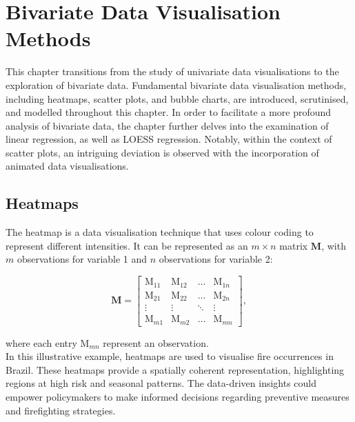 \documentclass{article}\usepackage[]{graphicx}\usepackage[]{xcolor}
\numberwithin{equation}{section}
\begin{document}
\newpage

\section{Bivariate Data Visualisation Methods}

\noindent This chapter transitions from the study of univariate data visualisations to the exploration of bivariate data. Fundamental bivariate data visualisation methods, including heatmaps, scatter plots, and bubble charts, are introduced, scrutinised, and modelled throughout this chapter. In order to facilitate a more profound analysis of bivariate data, the chapter further delves into the examination of linear regression, as well as LOESS regression. Notably, within the context of scatter plots, an intriguing deviation is observed with the incorporation of animated data visualisations.

\subsection{Heatmaps}
The heatmap is a data visualisation technique that uses colour coding to represent different intensities. It can be represented as an $m \times n$ matrix $\mathbf{M}$, with $m$ observations for variable 1 and $n$ observations for variable 2:

$$\mathbf{M} =
\left[
\begin{array}{cccc}
    \mathrm{M}_{11} & \mathrm{M}_{12} & \ldots & \mathrm{M}_{1n} \\  
    \mathrm{M}_{21} & \mathrm{M}_{22} & \ldots & \mathrm{M}_{2n} \\  
    \vdots & \vdots & \ddots & \vdots \\  
    \mathrm{M}_{m1} & \mathrm{M}_{m2} & \ldots & \mathrm{M}_{mn}
\end{array}
\right],
$$

\noindent
where each entry $\mathrm{M}_{mn}$ represent an observation.\\

\noindent
In this illustrative example, heatmaps are used to visualise fire occurrences in Brazil. These heatmaps provide a spatially coherent representation, highlighting regions at high risk and seasonal patterns. The data-driven insights could empower policymakers to make informed decisions regarding preventive measures and firefighting strategies.\\
\end{document}
